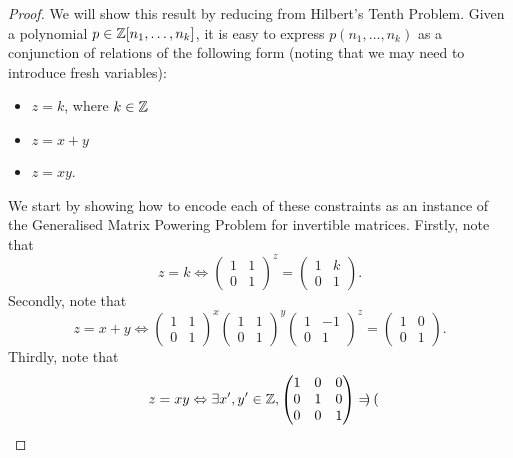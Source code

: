 \begin{proof}
We will show this result by reducing from Hilbert's Tenth Problem. Given a polynomial $p \in \mathbb{Z}[n_{1}, \ldots, n_{k}]$, it is easy to express $p(n_{1}, \ldots, n_{k})$ as a conjunction of relations of the following form (noting that we may need to introduce fresh variables):
\begin{itemize}
\item $z = k$, where $k \in \mathbb{Z}$
\item $z = x+y$
\item $z = xy$.
\end{itemize}
We start by showing how to encode each of these constraints as an instance of the Generalised Matrix Powering Problem for invertible matrices.
Firstly, note that
\begin{equation*}
z = k \Leftrightarrow
\begin{pmatrix}
    1 & 1 \\
    0 & 1
\end{pmatrix}^{z} =
\begin{pmatrix}
    1 & k \\
    0 & 1
\end{pmatrix}.
\end{equation*}
Secondly, note that
\begin{equation*}
    z = x + y \Leftrightarrow
\begin{pmatrix}
    1 & 1 \\
    0 & 1
\end{pmatrix}^{x}
\begin{pmatrix}
    1 & 1 \\
    0 & 1
\end{pmatrix}^{y}
\begin{pmatrix}
    1 & -1 \\
    0 & 1
\end{pmatrix}^{z} =
\begin{pmatrix}
    1 & 0 \\
    0 & 1
\end{pmatrix}.
\end{equation*}
Thirdly, note that
\begin{equation*}
    z = xy \Leftrightarrow
    \exists x',y' \in \mathbb{Z},
    \begin{pmatrix}
        1 & 0 & 0 \\
        0 & 1 & 0 \\
        0 & 0 & 1
    \end{pmatrix} =
    \begin{pmatrix}

\end{pmatrix}
\end{equation*}
\end{proof}
